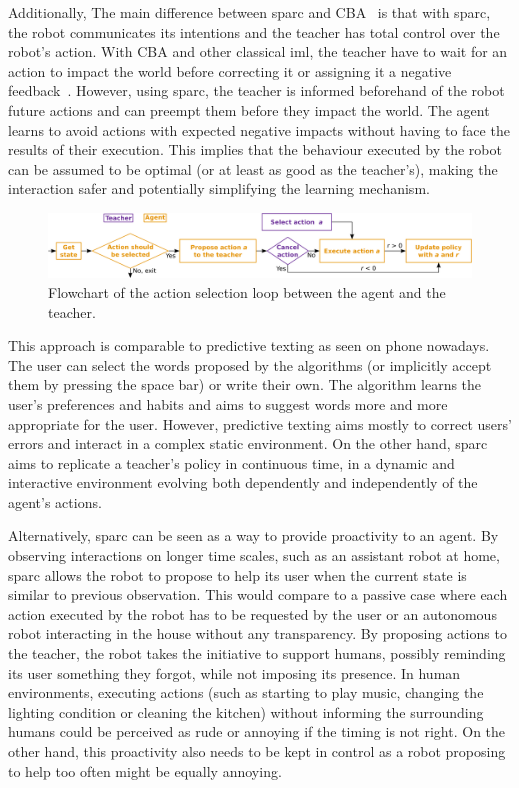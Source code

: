 Additionally, The main difference between \gls{sparc} and CBA~\citep{chernova2009interactive} is that with \gls{sparc}, the robot communicates its intentions and the teacher has total control over the robot's action. With CBA and other classical \gls{iml}, the teacher have to wait for an action to impact the world before correcting it or assigning it a negative feedback~\citep{thomaz2008teachable,knox2009interactively}. However, using \gls{sparc}, the teacher is informed beforehand of the robot future actions and can preempt them before they impact the world. The agent learns to avoid actions with expected negative impacts without having to face the results of their execution. This implies that the behaviour executed by the robot can be assumed to be optimal (or at least as good as the teacher's), making the interaction safer and potentially simplifying the learning mechanism.

\begin{figure}[ht]
	\includegraphics[width=1\linewidth]{flowchart.pdf}
	\centering
	\caption{Flowchart of the action selection loop between the agent and the teacher.}
	\label{fig:sparc_flowchart}
\end{figure}

This approach is comparable to predictive texting as seen on phone nowadays. The user can select the words proposed by the algorithms (or implicitly accept them by pressing the space bar) or write their own. The algorithm learns the user's preferences and habits and aims to suggest words more and more appropriate for the user. However, predictive texting aims mostly to correct users' errors and interact in a complex static environment. On the other hand, \gls{sparc} aims to replicate a teacher's policy in continuous time, in a dynamic and interactive environment evolving both dependently and independently of the agent's actions.

Alternatively, \gls{sparc} can be seen as a way to provide proactivity to an agent. By observing interactions on longer time scales, such as an assistant robot at home, \gls{sparc} allows the robot to propose to help its user when the current state is similar to previous observation. This would compare to a passive case where each action executed by the robot has to be requested by the user or an autonomous robot interacting in the house without any transparency. By proposing actions to the teacher, the robot takes the initiative to support humans, possibly reminding its user something they forgot, while not imposing its presence. In human environments, executing actions (such as starting to play music, changing the lighting condition or cleaning the kitchen) without informing the surrounding humans could be perceived as rude or annoying if the timing is not right. On the other hand, this proactivity also needs to be kept in control as a robot proposing to help too often might be equally annoying.

